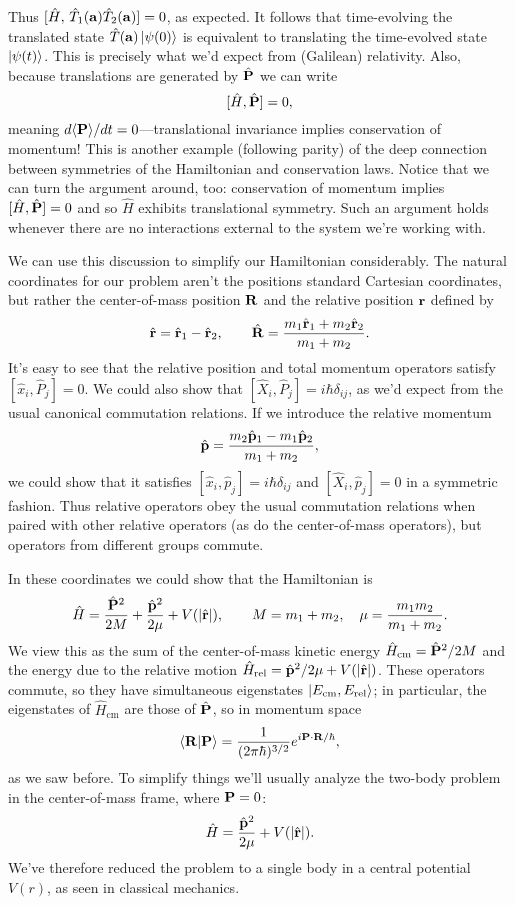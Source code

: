 \documentclass[../p116main.tex]{subfiles}
\begin{document}
Thus $[\hat H, \, \hat T_1(\mathbf{a}) \hat T_2(\mathbf{a})] = 0$, as expected.
It follows that time-evolving the translated state $\hat T(\mathbf{a}) \left| \psi(0) \right>$ is equivalent to translating the time-evolved state $\left| \psi(t) \right>$.
This is precisely what we'd expect from (Galilean) relativity.
Also, because translations are generated by $\hat{\mathbf{P}}$ we can write
\[ [\hat H, \hat{\mathbf{P}}] = 0, \]
meaning $d \langle \mathbf{P} \rangle / dt = 0$---translational invariance implies conservation of momentum!
This is another example (following parity) of the deep connection between symmetries of the Hamiltonian and conservation laws.
Notice that we can turn the argument around, too: conservation of momentum implies $[\hat H, \hat{\mathbf{P}}] = 0$ and so $\hat H$ exhibits translational symmetry.
Such an argument holds whenever there  are no interactions external to the system we're working with.

We can use this discussion to simplify our Hamiltonian considerably.
The natural coordinates for our problem aren't the positions standard Cartesian coordinates, but rather the center-of-mass position $\mathbf{R}$ and the relative position $\mathbf{r}$ defined by
\[ \hat{\mathbf{r}} = \hat{\mathbf{r}}_1 - \hat{\mathbf{r}}_2, \qquad \hat{\mathbf{R}} = \frac{m_1 \hat{\mathbf{r}}_1 + m_2 \hat{\mathbf{r}}_2}{m_1 + m_2}. \]
It's easy to see that the relative position and total momentum operators satisfy $[\hat x_i, \hat P_j] = 0$.
We could also show that $[\hat X_i, \hat P_j] = i\hbar \delta_{ij}$, as we'd expect from the usual canonical commutation relations.
If we introduce the relative momentum
\[ \hat{\mathbf{p}} = \frac{m_2 \hat{\mathbf{p}}_1 - m_1 \hat{\mathbf{p}}_2}{m_1 + m_2}, \]
we could show that it satisfies $[\hat x_i, \hat p_j] = i\hbar \delta_{ij}$ and $[\hat X_i, \hat p_j] = 0$ in a symmetric fashion.
Thus relative operators obey the usual commutation relations when paired with other relative operators (as do the center-of-mass operators), but operators from different groups commute.

In these coordinates we could show that the Hamiltonian is
\[ \hat H = \frac{\hat{\mathbf{P}}^2}{2M} + \frac{\hat{\mathbf{p}}^2}{2\mu} + V(|\hat{\mathbf{r}}|), \qquad M = m_1 + m_2, \quad \mu = \frac{m_1 m_2}{m_1 + m_2}. \]
We view this as the sum of the center-of-mass kinetic energy $\hat H_\textrm{cm} = \hat{\mathbf{P}}^2 / 2M$ and the energy due to the relative motion $\hat H_\textrm{rel} = \hat{\mathbf{p}}^2 / 2\mu + V(|\hat{\mathbf{r}}|)$.
These operators commute, so they have simultaneous eigenstates $\left| E_\textrm{cm}, E_\textrm{rel} \right>$; in particular, the eigenstates of $\hat H_\textrm{cm}$ are those of $\hat{\mathbf{P}}$, so in momentum space
\[ \left< \mathbf{R} \middle| \mathbf{P} \right> = \frac{1}{(2\pi\hbar)^{3 / 2}} e^{i \mathbf{P} \cdot \mathbf{R} / \hbar}, \]
as we saw before.
To simplify things we'll usually analyze the two-body problem in the center-of-mass frame, where $\mathbf{P} = 0$:
\[ \hat H = \frac{\hat{\mathbf{p}}^2}{2\mu} + V(|\hat{\mathbf{r}}|). \]
We've therefore reduced the problem to a single body in a central potential $V(r)$, as seen in classical mechanics.
\end{document}
